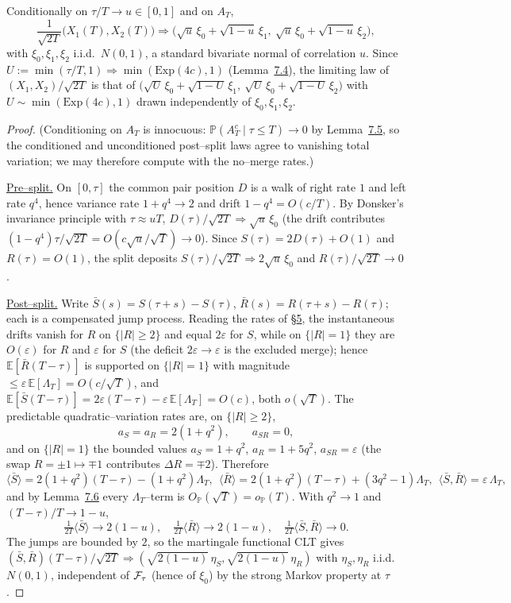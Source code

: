\documentclass[11pt]{article}
\theoremstyle{plain}
\theoremstyle{definition}
\theoremstyle{remark}
\newcommand{\E}{\mathbb{E}}\newcommand{\PP}{\mathbb{P}}\newcommand{\dd}{\,\mathrm{d}}
\newcommand{\To}{\Rightarrow}\newcommand{\so}{\mathfrak{so}}
\newcommand{\eps}{\varepsilon}\newcommand{\Exp}{\mathrm{Exp}}
\begin{document}
Conditionally on $\tau/T\to u\in[0,1]$ and on $A_T$,
\[
  \frac1{\sqrt{2T}}\big(X_1(T),X_2(T)\big)\To
  \big(\sqrt u\,\xi_0+\sqrt{1-u}\,\xi_1,\ \sqrt u\,\xi_0+\sqrt{1-u}\,\xi_2\big),
\]
with $\xi_0,\xi_1,\xi_2$ i.i.d.\ $N(0,1)$, a standard bivariate normal of correlation $u$.
Since $U:=\min(\tau/T,1)\To\min(\Exp(4c),1)$ (Lemma~\hyperref[lem_split]{7.4}), the limiting law of
$(X_1,X_2)/\sqrt{2T}$ is that of
$\big(\sqrt U\,\xi_0+\sqrt{1-U}\,\xi_1,\ \sqrt U\,\xi_0+\sqrt{1-U}\,\xi_2\big)$ with
$U\sim\min(\Exp(4c),1)$ drawn independently of $\xi_0,\xi_1,\xi_2$.
\par
\begin{proof}
(Conditioning on $A_T$ is innocuous: $\PP(A_T^c\mid\tau\le T)\to0$ by
Lemma~\hyperref[lem_rebind]{7.5}, so the conditioned and unconditioned post--split laws agree
to vanishing total variation; we may therefore compute with the no--merge rates.)

\underline{Pre--split.} On $[0,\tau]$ the common pair position $D$ is a walk of right rate
$1$ and left rate $q^4$, hence variance rate $1+q^4\to2$ and drift $1-q^4=O(c/T)$. By
Donsker's invariance principle with $\tau\approx uT$, $D(\tau)/\sqrt{2T}\To\sqrt u\,\xi_0$
(the drift contributes $(1-q^4)\tau/\sqrt{2T}=O(c\sqrt u/\sqrt T)\to0$). Since
$S(\tau)=2D(\tau)+O(1)$ and $R(\tau)=O(1)$, the split deposits
$S(\tau)/\sqrt{2T}\To2\sqrt u\,\xi_0$ and $R(\tau)/\sqrt{2T}\to0$.

\underline{Post--split.} Write $\bar S(s)=S(\tau{+}s)-S(\tau)$, $\bar R(s)=R(\tau{+}s)-R(\tau)$;
each is a compensated jump process. Reading the rates of \S\hyperref[sec_kernel]{5}, the
instantaneous drifts vanish for $R$ on $\{|R|\ge2\}$ and equal $2\eps$ for $S$, while on
$\{|R|=1\}$ they are $O(\eps)$ for $R$ and $\eps$ for $S$ (the deficit $2\eps\to\eps$ is
the excluded merge); hence $\E[\bar R(T{-}\tau)]$ is supported on $\{|R|=1\}$ with
magnitude $\le\eps\,\E[\Lambda_T]=O(c/\sqrt T)$, and
$\E[\bar S(T{-}\tau)]=2\eps(T{-}\tau)-\eps\,\E[\Lambda_T]=O(c)$, both $o(\sqrt T)$. The
predictable quadratic--variation rates are, on $\{|R|\ge2\}$,
\[
  a_S=a_R=2(1+q^2),\qquad a_{SR}=0,
\]
and on $\{|R|=1\}$ the bounded values $a_S=1+q^2$, $a_R=1+5q^2$, $a_{SR}=\eps$ (the swap
$R=\pm1\mapsto\mp1$ contributes $\Delta R=\mp2$). Therefore
\[
  \langle\bar S\rangle=2(1+q^2)(T{-}\tau)-(1+q^2)\Lambda_T,\ \
  \langle\bar R\rangle=2(1+q^2)(T{-}\tau)+(3q^2{-}1)\Lambda_T,\ \
  \langle\bar S,\bar R\rangle=\eps\,\Lambda_T,
\]
and by Lemma~\hyperref[lem_occ]{7.6} every $\Lambda_T$--term is $O_\PP(\sqrt T)=o_\PP(T)$. With
$q^2\to1$ and $(T{-}\tau)/T\to1-u$,
\[
  \tfrac1{2T}\langle\bar S\rangle\to2(1-u),\quad
  \tfrac1{2T}\langle\bar R\rangle\to2(1-u),\quad
  \tfrac1{2T}\langle\bar S,\bar R\rangle\to0.
\]
The jumps are bounded by $2$, so the martingale functional CLT
\cite[Thm.~7.1.4]{EK} gives $(\bar S,\bar R)(T{-}\tau)/\sqrt{2T}\To
(\sqrt{2(1-u)}\,\eta_S,\sqrt{2(1-u)}\,\eta_R)$ with $\eta_S,\eta_R$ i.i.d.\ $N(0,1)$,
independent of $\mathcal F_\tau$ (hence of $\xi_0$) by the strong Markov property at $\tau$.


\end{proof}
\end{document}
